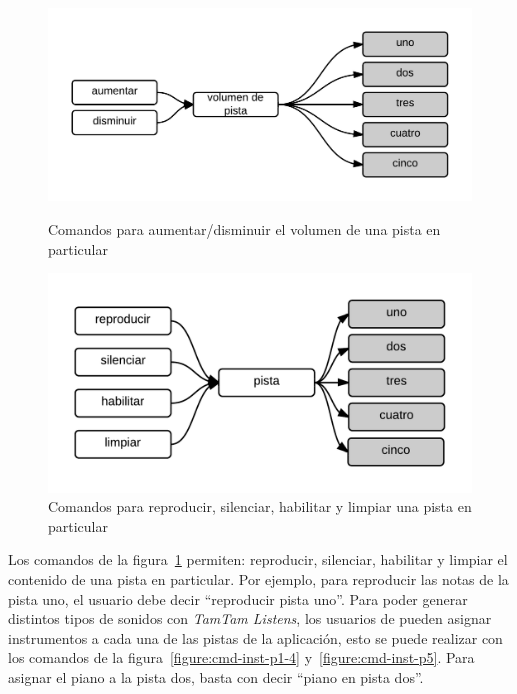 \begin{figure}[H]  
\begin{minipage}[b]{0.5\linewidth}
\centering
\includegraphics[width=0.8\linewidth]{./graphics/vol-pista.png}
\caption{Comandos para aumentar/disminuir el volumen de una pista en particular}
\label{figure:cmd-vol-pista-anexo}
\end{minipage}
\quad
\begin{minipage}[b]{0.5\linewidth}
\centering
\includegraphics[width=0.9\linewidth]{./graphics/rep-pista.png}
\caption{Comandos para reproducir, silenciar, habilitar y limpiar una pista en particular}
\label{figure:cmd-rep-pista-anexo}
\end{minipage}
\end{figure}

Los comandos de la figura~\ref{figure:cmd-rep-pista-anexo} permiten: reproducir, silenciar, habilitar y limpiar el contenido de una
pista en particular. Por ejemplo, para reproducir las notas de la pista uno, el usuario debe decir ``reproducir pista uno''. 
Para poder generar distintos tipos de sonidos con \emph{TamTam Listens}, los usuarios de pueden asignar
instrumentos a cada una de las pistas de
la aplicaci\'on, esto se puede realizar con los comandos de la figura~\ref{figure:cmd-inst-p1-4} y~\ref{figure:cmd-inst-p5}. Para
asignar el piano a la pista dos, basta con decir ``piano en pista dos''.



